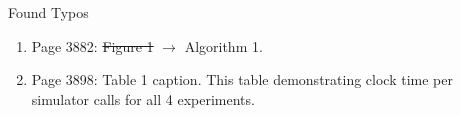 \documentclass[11pt]{beamer}
\begin{document}
\begin{frame}{Found Typos}

        \begin{enumerate}
            \item Page 3882: \sout{Figure 1} $ \rightarrow $ Algorithm 1.
            \item Page 3898: Table 1 caption. This table demonstrating clock time per simulator calls for all 4 experiments.
        \end{enumerate}
\end{frame}
\end{document}

